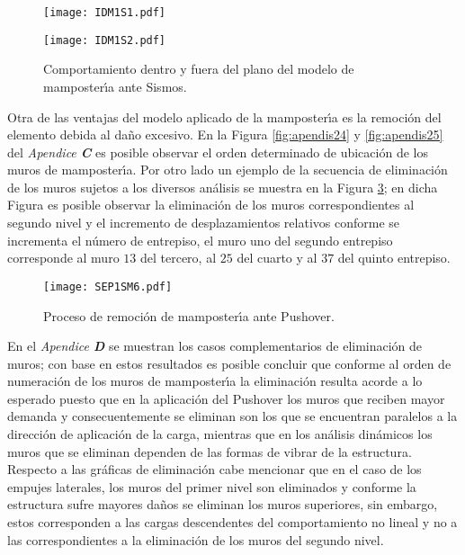 \begin{figure} [htbp]
\texttt{[image: IDM1S1.pdf]}
\label{fig:rf7}
\end{figure}

\begin{figure} [htbp]
\texttt{[image: IDM1S2.pdf]}
\caption{Comportamiento dentro y fuera del plano del modelo de mamposter\'{\i}a ante Sismos.}
\label{fig:rf8}
\end{figure}

Otra de las ventajas del modelo aplicado de la mamposter\'{\i}a es la remoci\'on del elemento debida al da\~no excesivo. En la Figura \ref{fig:apendis24} y \ref{fig:apendis25} del \emph{Apendice \textbf{C}} es posible observar el orden determinado de ubicaci\'on de los muros de mamposter\'{\i}a. Por otro lado un ejemplo de la secuencia de eliminaci\'on de los muros sujetos  a los diversos an\'alisis se muestra en la Figura \ref{fig:rf11}; en dicha Figura es posible observar la eliminaci\'on de los muros correspondientes al segundo nivel y el incremento de desplazamientos relativos conforme se incrementa el n\'umero de entrepiso, el muro uno del segundo entrepiso corresponde al muro $13$ del tercero, al $25$ del cuarto y al $37$ del quinto entrepiso.

\begin{figure} [htbp]
\texttt{[image: SEP1SM6.pdf]}
\caption{Proceso de remoci\'on de mamposter\'{\i}a ante Pushover.}
\label{fig:rf11}
\end{figure}

\newpage

En el \emph{Apendice \textbf{D}} se muestran los casos complementarios de eliminaci\'on de muros; con base en estos resultados es posible concluir que conforme al orden de numeraci\'on de los muros de mamposter\'{\i}a la eliminaci\'on resulta acorde a lo esperado puesto que en la aplicaci\'on del Pushover los muros que reciben mayor demanda y consecuentemente se eliminan son los que se encuentran paralelos a la direcci\'on de aplicaci\'on de la carga, mientras que en los an\'alisis din\'amicos los muros que se eliminan dependen de las formas de vibrar de la estructura. Respecto a las gr\'aficas de eliminaci\'on cabe mencionar que en el caso de los empujes laterales, los muros del primer nivel son eliminados y conforme la estructura sufre mayores da\~nos se eliminan los muros superiores, sin embargo, estos corresponden a las cargas descendentes del comportamiento no lineal y no a las correspondientes a la eliminaci\'on de los muros del segundo nivel.

